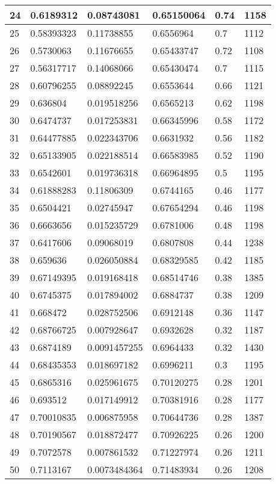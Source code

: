 \begin{longtable}{|l|l|l|l|l|l|}
24 & 0.6189312 & 0.08743081 & 0.65150064 & 0.74 & 1158 \\ \hline 
25 & 0.58393323 & 0.11738855 & 0.6556964 & 0.7 & 1112 \\ \hline 
26 & 0.5730063 & 0.11676655 & 0.65433747 & 0.72 & 1108 \\ \hline 
27 & 0.56317717 & 0.14068066 & 0.65430474 & 0.7 & 1115 \\ \hline 
28 & 0.60796255 & 0.08892245 & 0.6553644 & 0.66 & 1121 \\ \hline 
29 & 0.636804 & 0.019518256 & 0.6565213 & 0.62 & 1198 \\ \hline 
30 & 0.6474737 & 0.017253831 & 0.66345996 & 0.58 & 1172 \\ \hline 
31 & 0.64477885 & 0.022343706 & 0.6631932 & 0.56 & 1182 \\ \hline 
32 & 0.65133905 & 0.022188514 & 0.66583985 & 0.52 & 1190 \\ \hline 
33 & 0.6542601 & 0.019736318 & 0.66964895 & 0.5 & 1195 \\ \hline 
34 & 0.61888283 & 0.11806309 & 0.6744165 & 0.46 & 1177 \\ \hline 
35 & 0.6504421 & 0.02745947 & 0.67654294 & 0.46 & 1198 \\ \hline 
36 & 0.6663656 & 0.015235729 & 0.6781006 & 0.48 & 1198 \\ \hline 
37 & 0.6417606 & 0.09068019 & 0.6807808 & 0.44 & 1238 \\ \hline 
38 & 0.659636 & 0.026050884 & 0.68329585 & 0.42 & 1185 \\ \hline 
39 & 0.67149395 & 0.019168418 & 0.68514746 & 0.38 & 1385 \\ \hline 
40 & 0.6745375 & 0.017894002 & 0.6884737 & 0.38 & 1209 \\ \hline 
41 & 0.668472 & 0.028752506 & 0.6912148 & 0.36 & 1147 \\ \hline 
42 & 0.68766725 & 0.007928647 & 0.6932628 & 0.32 & 1187 \\ \hline 
43 & 0.6874189 & 0.0091457255 & 0.6964433 & 0.32 & 1430 \\ \hline 
44 & 0.68435353 & 0.018697182 & 0.6996211 & 0.3 & 1195 \\ \hline 
45 & 0.6865316 & 0.025961675 & 0.70120275 & 0.28 & 1201 \\ \hline 
46 & 0.693512 & 0.017149912 & 0.70381916 & 0.28 & 1177 \\ \hline 
47 & 0.70010835 & 0.006875958 & 0.70644736 & 0.28 & 1387 \\ \hline 
48 & 0.70190567 & 0.018872477 & 0.70926225 & 0.26 & 1200 \\ \hline 
49 & 0.7072578 & 0.007861532 & 0.71227974 & 0.26 & 1211 \\ \hline 
50 & 0.7113167 & 0.0073484364 & 0.71483934 & 0.26 & 1208 \\ \hline 
\end{longtable}